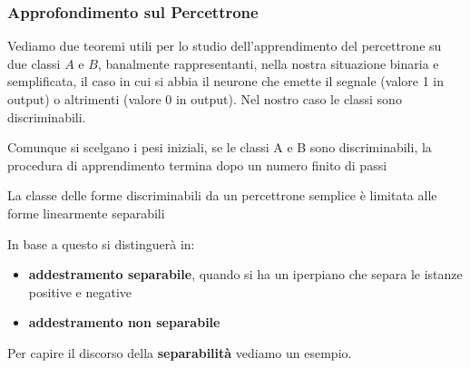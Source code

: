 

\subsubsection{Approfondimento sul Percettrone}
Vediamo due teoremi utili per lo studio dell'apprendimento del percettrone su due classi $A$ e $B$, banalmente rappresentanti, nella nostra situazione binaria e semplificata, il caso in cui si abbia il neurone che emette il segnale (valore 1 in output) o altrimenti (valore 0 in output). Nel nostro caso le classi sono discriminabili.
\begin{definizione}
	Comunque si scelgano i pesi iniziali, se le classi A e B sono discriminabili,
	la procedura di apprendimento termina dopo un numero finito di passi
\end{definizione}
\begin{definizione}
	La classe delle forme discriminabili da un percettrone semplice è
	limitata alle forme linearmente separabili
\end{definizione}
In base a questo si distinguerà in:
\begin{itemize}
	\item \textbf{addestramento separabile}, quando si ha un iperpiano che separa
	      le istanze positive e negative
	\item \textbf{addestramento non separabile}
\end{itemize}
Per capire il discorso della \textbf{separabilità} vediamo un esempio.
